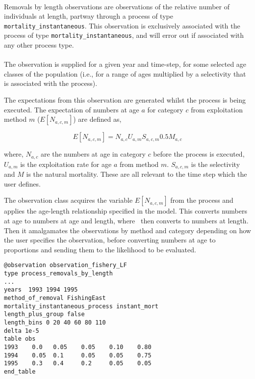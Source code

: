 {{{{\begin{itemize}
\paragraph*{\label{sec:removals-by-length}}
Removals by length observations are observations of the relative number of individuals at length, partway through a process of type \texttt{mortality\_instantaneous}. This observation is exclusively associated with the process of type \texttt{mortality\_instantaneous}, and will error out if associated with any other process type.
\\\\
The observation is supplied for a given year and time-step, for some selected age classes of the population (i.e., for a range of ages multiplied by a selectivity that is associated with the process).

The expectations from this observation are generated whilst the process is being executed. The expectation of numbers at age $a$ for category $c$ from exploitation method $m$ ($E[N_{a,c,m}]$) are defined as,


\begin{equation}
E[N_{a,c,m}] = N_{a,c} U_{a,m} S_{a,c,m} 0.5 M_{a,c}
\end{equation}

where, $N_{a,c}$ are the numbers at age in category $c$ before the process is executed, $U_{a,m}$ is the exploitation rate for age $a$ from method $m$. $S_{a,c,m}$ is the selectivity and $M$ is the natural mortality. These are all relevant to the time step which the user defines.

The observation class acquires the variable $E[N_{a,c,m}]$ from the process and applies the age-length relationship specified in the model. This converts numbers at age to numbers at age and length, where \CNAME\ then converts to numbers at length. Then it amalgamates the observations by method and category depending on how the user specifies the observation, before converting numbers at age to proportions and sending them to the likelihood to be evaluated.
{\small{\begin{verbatim}
@observation observation_fishery_LF
type process_removals_by_length
...
years  1993 1994 1995 
method_of_removal FishingEast
mortality_instantaneous_process instant_mort
length_plus_group false
length_bins 0 20 40 60 80 110
delta 1e-5
table obs
1993    0.0   0.05    0.05    0.10    0.80  
1994    0.05  0.1     0.05    0.05    0.75  
1995    0.3   0.4     0.2     0.05    0.05  
end_table


\end{verbatim}}}
\end{itemize}}}}}
